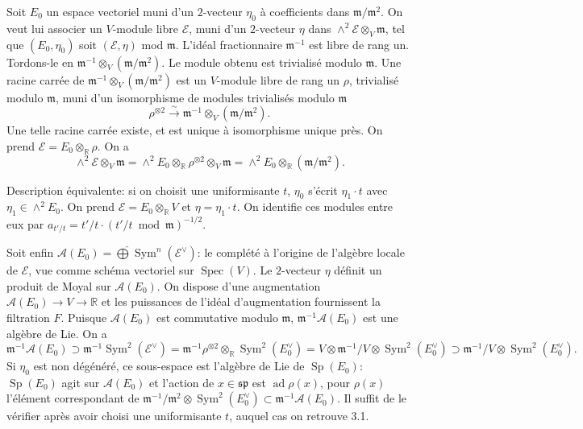 \documentclass[11pt,a4paper]{article}
\theoremstyle{plain}
\theoremstyle{definition}
\DeclareMathOperator{\Spec}{Spec}
\DeclareMathOperator{\ad}{ad}
\DeclareMathOperator{\Sp}{Sp}
\DeclareMathOperator{\Sym}{Sym}
\newcommand{\R}{\mathbb{R}}
\newcommand{\iso}{\xrightarrow{\sim}}
\begin{document}
Soit $E_{0}$ un espace vectoriel muni d'un $2$-vecteur $\eta_{0}$ \`a coefficients dans $\mathfrak{m}/\mathfrak{m}^{2}$.
On veut lui associer un $V$-module libre $\mathcal{E}$, muni d'un $2$-vecteur $\eta$ dans $\wedge^{2} \mathcal{E} \otimes_{V} \mathfrak{m}$, tel que $(E_{0}, \eta_{0})$ soit $(\mathcal{E}, \eta)$ mod $\mathfrak{m}$. L'id\'eal fractionnaire $\mathfrak{m}^{-1}$ est libre de rang un.
Tordons-le en $\mathfrak{m}^{-1} \otimes_{V} (\mathfrak{m}/\mathfrak{m}^{2})$. Le module obtenu est trivialis\'e modulo $\mathfrak{m}$. Une racine carr\'ee de $\mathfrak{m}^{-1} \otimes_{V} (\mathfrak{m}/\mathfrak{m}^{2})$ est un $V$-module libre de rang un $\rho$, trivialis\'e modulo $\mathfrak{m}$, muni d'un isomorphisme de modules trivialis\'es modulo $\mathfrak{m}$
\[
\rho^{\otimes 2} \iso \mathfrak{m}^{-1} \otimes_{V} (\mathfrak{m}/\mathfrak{m}^{2}).
\]
Une telle racine carr\'ee existe, et est unique \`a isomorphisme unique pr\`es. On prend $\mathcal{E} = E_{0} \otimes_{\R} \rho$. On a
\[
\wedge^{2}\mathcal{E} \otimes_{V} \mathfrak{m} = \wedge^{2} E_{0} \otimes_{\R} \rho^{\otimes 2} \otimes_{V} \mathfrak{m} = \wedge^{2} E_{0} \otimes_{\R} (\mathfrak{m}/\mathfrak{m}^{2}).
\]

Description \'equivalente: si on choisit une uniformisante $t$, $\eta_{0}$ s'\'ecrit $\eta_{1} \cdot t$ avec
$\eta_{1} \in \wedge^{2} E_{0}$. On prend $\mathcal{E} = E_{0} \otimes_{\R} V$ et $\eta = \eta_{1} \cdot t$. On identifie ces modules entre eux par $a_{t'/t} = t'/t \cdot (t'/t \bmod \mathfrak{m})^{-1/2}$.

Soit enfin $\mathcal{A}(E_{0}) = \widehat{\bigoplus} \Sym^{n}(\mathcal{E}^{\vee})$: le compl\'et\'e \`a l'origine de l'alg\`ebre locale de $\mathcal{E}$, vue comme sch\'ema vectoriel sur $\Spec(V)$. Le $2$-vecteur $\eta$ d\'efinit un produit de Moyal sur $\mathcal{A}(E_{0})$. On dispose d'une augmentation $\mathcal{A}(E_{0}) \to V \to \R$ et les puissances de l'id\'eal d'augmentation fournissent la filtration $F$. Puisque $\mathcal{A}(E_{0})$ est commutative modulo $\mathfrak{m}$, $\mathfrak{m}^{-1}\mathcal{A}(E_{0})$ est une alg\`ebre de Lie. On a
\[
\mathfrak{m}^{-1}\mathcal{A}(E_{0}) \supset \mathfrak{m}^{-1}\Sym^{2}(\mathcal{E}^{\vee}) = \mathfrak{m}^{-1}\rho^{\otimes 2} \otimes_{\R} \Sym^{2}(E_{0}^{\vee}) = V \otimes \mathfrak{m}^{-1}/V \otimes \Sym^{2}(E_{0}^{\vee}) \supset \mathfrak{m}^{-1}/V \otimes \Sym^{2}(E_{0}^{\vee}).
\]
Si $\eta_{0}$ est non d\'eg\'en\'er\'e, ce sous-espace est l'alg\`ebre de Lie de $\Sp(E_{0})$: $\Sp(E_{0})$ agit
sur $\mathcal{A}(E_{0})$ et l'action de $x \in \mathfrak{sp}$ est $\ad \rho(x)$, pour $\rho(x)$ l'\'el\'ement correspondant de $\mathfrak{m}^{-1}/\mathfrak{m}^{2} \otimes \Sym^{2}(E_{0}^{\vee}) \subset \mathfrak{m}^{-1}\mathcal{A}(E_{0})$. Il suffit de le v\'erifier apr\`es avoir choisi une uniformisante $t$, auquel cas on retrouve 3.1.
\end{document}
